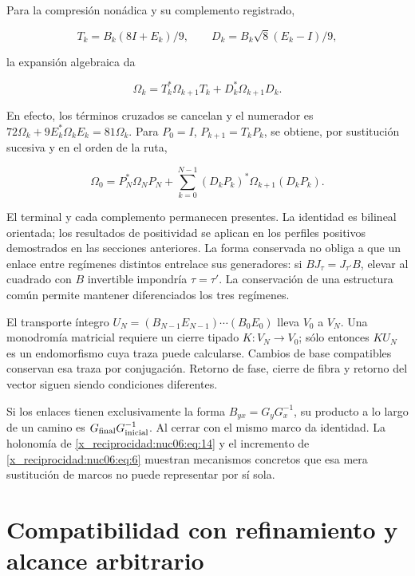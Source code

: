 Para la compresión nonádica y su complemento registrado,

\[
T_k=B_k(8I+E_k)/9,\qquad
D_k=B_k\sqrt8(E_k-I)/9,
\]

la expansión algebraica da

\begin{equation}
\Omega_k=T_k^*\Omega_{k+1}T_k+D_k^*\Omega_{k+1}D_k.
\label{x_reciprocidad:nuc06:eq:17}
\end{equation}

En efecto, los términos cruzados se cancelan y el numerador es \(72\Omega_k+9E_k^*\Omega_kE_k=81\Omega_k\). Para \(P_0=I\), \(P_{k+1}=T_kP_k\), se obtiene, por sustitución sucesiva y en el orden de la ruta,

\begin{equation}
\boxed{\quad
\Omega_0=P_N^*\Omega_NP_N+
\sum_{k=0}^{N-1}(D_kP_k)^*\Omega_{k+1}(D_kP_k).
\quad}
\label{x_reciprocidad:nuc06:eq:18}
\end{equation}

El terminal y cada complemento permanecen presentes. La identidad es bilineal orientada; los resultados de positividad se aplican en los perfiles positivos demostrados en las secciones anteriores. La forma conservada no obliga a que un enlace entre regímenes distintos entrelace sus generadores: si \(BJ_\tau=J_{\tau'}B\), elevar al cuadrado con \(B\) invertible impondría \(\tau=\tau'\). La conservación de una estructura común permite mantener diferenciados los tres regímenes.

El transporte íntegro \(U_N=(B_{N-1}E_{N-1})\cdots(B_0E_0)\) lleva \(V_0\) a \(V_N\). Una monodromía matricial requiere un cierre tipado \(K:V_N\to V_0\); sólo entonces \(KU_N\) es un endomorfismo cuya traza puede calcularse. Cambios de base compatibles conservan esa traza por conjugación. Retorno de fase, cierre de fibra y retorno del vector siguen siendo condiciones diferentes.

Si los enlaces tienen exclusivamente la forma \(B_{yx}=G_yG_x^{-1}\), su producto a lo largo de un camino es \(G_{\rm final}G_{\rm inicial}^{-1}\). Al cerrar con el mismo marco da identidad. La holonomía de \eqref{x_reciprocidad:nuc06:eq:14} y el incremento de \eqref{x_reciprocidad:nuc06:eq:6} muestran mecanismos concretos que esa mera sustitución de marcos no puede representar por sí sola.

\section{Compatibilidad con refinamiento y alcance arbitrario}

